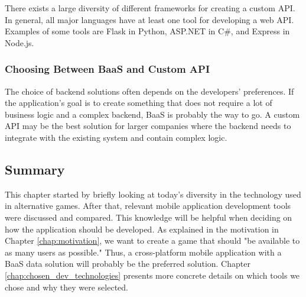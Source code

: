 There exists a large diversity of different frameworks for creating a custom API. In general, all major languages have at least one tool for developing a web API. Examples of some tools are Flask in Python, ASP.NET in C\#, and Express in Node.js.

\subsubsection{Choosing Between BaaS and Custom API}
The choice of backend solutions often depends on the developers’ preferences. If the application’s goal is to create something that does not require a lot of business logic and a complex backend, BaaS is probably the way to go. A custom API may be the best solution for larger companies where the backend needs to integrate with the existing system and contain complex logic.

\subsection{Summary}
This chapter started by briefly looking at today’s diversity in the technology used in alternative games. After that, relevant mobile application development tools were discussed and compared. This knowledge will be helpful when deciding on how the application should be developed. As explained in the motivation in Chapter \ref{chap:motivation}, we want to create a game that should "be available to as many users as possible." Thus, a cross-platform mobile application with a BaaS data solution will probably be the preferred solution. Chapter \ref{chap:chosen_dev_technologies} presents more concrete details on which tools we chose and why they were selected.